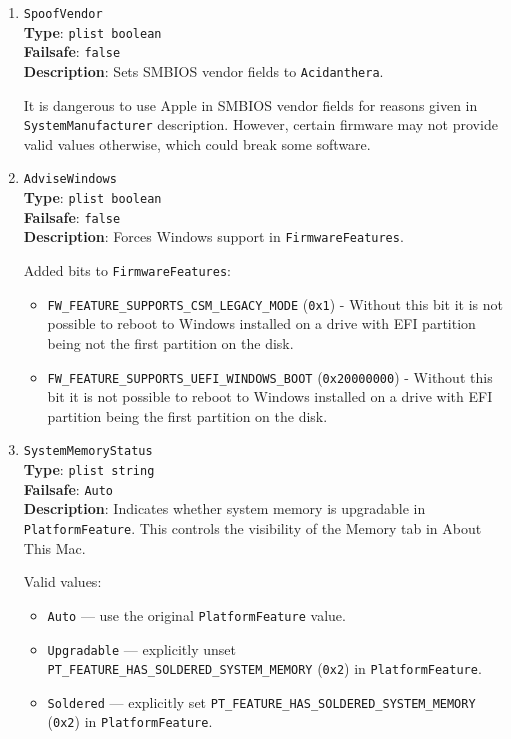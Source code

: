 \documentclass[]{article}
\providecommand{\tightlist}{%
  \setlength{\itemsep}{0pt}\setlength{\parskip}{0pt}}
\begin{document}
\begin{enumerate}
\item
  \texttt{SpoofVendor}\\
  \textbf{Type}: \texttt{plist\ boolean}\\
  \textbf{Failsafe}: \texttt{false}\\
  \textbf{Description}: Sets SMBIOS vendor fields to \texttt{Acidanthera}.

  It is dangerous to use Apple in SMBIOS vendor fields for reasons given
  in \texttt{SystemManufacturer} description. However, certain firmware
  may not provide valid values otherwise, which could break some software.

\item
  \texttt{AdviseWindows}\\
  \textbf{Type}: \texttt{plist\ boolean}\\
  \textbf{Failsafe}: \texttt{false}\\
  \textbf{Description}: Forces Windows support in \texttt{FirmwareFeatures}.

  Added bits to \texttt{FirmwareFeatures}:

  \begin{itemize}
    \item \texttt{FW\_FEATURE\_SUPPORTS\_CSM\_LEGACY\_MODE} (\texttt{0x1})
    - Without this bit it is not possible to reboot to Windows installed on
      a drive with EFI partition being not the first partition on the disk.
    \item \texttt{FW\_FEATURE\_SUPPORTS\_UEFI\_WINDOWS\_BOOT} (\texttt{0x20000000})
    - Without this bit it is not possible to reboot to Windows installed on
      a drive with EFI partition being the first partition on the disk.
  \end{itemize}

\item
  \texttt{SystemMemoryStatus}\\
  \textbf{Type}: \texttt{plist\ string}\\
  \textbf{Failsafe}: \texttt{Auto}\\
  \textbf{Description}: Indicates whether system memory is upgradable in \texttt{PlatformFeature}.
  This controls the visibility of the Memory tab in About This Mac.

  Valid values:

  \begin{itemize}
    \tightlist
    \item \texttt{Auto} --- use the original \texttt{PlatformFeature} value.
    \item \texttt{Upgradable} --- explicitly unset \texttt{PT\_FEATURE\_HAS\_SOLDERED\_SYSTEM\_MEMORY}
    (\texttt{0x2}) in \texttt{PlatformFeature}.
    \item \texttt{Soldered} --- explicitly set \texttt{PT\_FEATURE\_HAS\_SOLDERED\_SYSTEM\_MEMORY}
    (\texttt{0x2}) in \texttt{PlatformFeature}.
  \end{itemize}


\end{enumerate}
\end{document}
